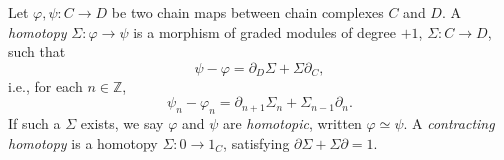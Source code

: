 Let $\varphi, \psi : C \to D$ be two chain maps between chain complexes $C$ and $D$. A \emph{homotopy} $\Sigma : \varphi \to \psi$ is a morphism of graded modules of degree $+1$, $\Sigma : C \to D$, such that
$$\psi - \varphi = \partial_D \Sigma + \Sigma \partial_C,$$
i.e., for each $n \in \mathbb{Z}$,
$$\psi_n - \varphi_n = \partial_{n+1} \Sigma_n + \Sigma_{n-1} \partial_n.$$
If such a $\Sigma$ exists, we say $\varphi$ and $\psi$ are \emph{homotopic}, written $\varphi \simeq \psi$. A \emph{contracting homotopy} is a homotopy $\Sigma : 0 \to 1_C$, satisfying $\partial \Sigma + \Sigma \partial = 1$.